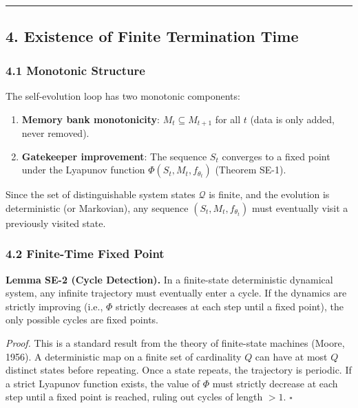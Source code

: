\documentclass[
  12pt,
]{ctexart}
\providecommand{\tightlist}{%
  \setlength{\itemsep}{0pt}\setlength{\parskip}{0pt}}
\begin{document}
\begin{center}\rule{0.5\linewidth}{0.5pt}\end{center}

\subsection{4. Existence of Finite Termination
Time}\label{existence-of-finite-termination-time}

\subsubsection{4.1 Monotonic Structure}\label{monotonic-structure}

The self-evolution loop has two monotonic components:

\begin{enumerate}
\def\labelenumi{\arabic{enumi}.}
\tightlist
\item
  \textbf{Memory bank monotonicity}: \(M_t \subseteq M_{t+1}\) for all
  \(t\) (data is only added, never removed).
\item
  \textbf{Gatekeeper improvement}: The sequence \(S_t\) converges to a
  fixed point under the Lyapunov function
  \(\Phi(S_t, M_t, f_{\theta_t})\) (Theorem SE-1).
\end{enumerate}

Since the set of distinguishable system states \(\mathcal{Q}\) is
finite, and the evolution is deterministic (or Markovian), any sequence
\((S_t, M_t, f_{\theta_t})\) must eventually visit a previously visited
state.

\subsubsection{4.2 Finite-Time Fixed
Point}\label{finite-time-fixed-point}

\textbf{Lemma SE-2 (Cycle Detection).} In a finite-state deterministic
dynamical system, any infinite trajectory must eventually enter a cycle.
If the dynamics are strictly improving (i.e., \(\Phi\) strictly
decreases at each step until a fixed point), the only possible cycles
are fixed points.

\emph{Proof.} This is a standard result from the theory of finite-state
machines (Moore, 1956). A deterministic map on a finite set of
cardinality \(Q\) can have at most \(Q\) distinct states before
repeating. Once a state repeats, the trajectory is periodic. If a strict
Lyapunov function exists, the value of \(\Phi\) must strictly decrease
at each step until a fixed point is reached, ruling out cycles of length
\(>1\). \(\square\)
\end{document}
